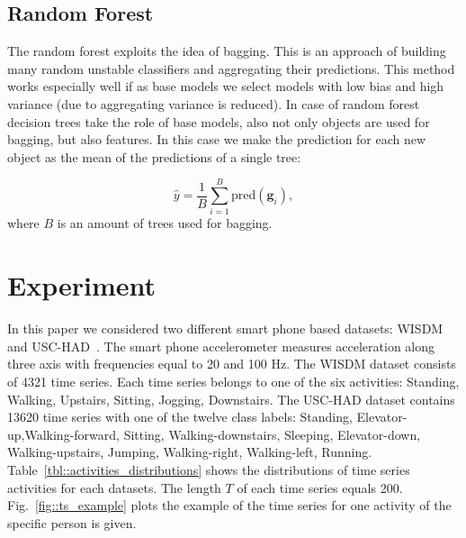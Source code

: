 \subsection{Random Forest}
The random forest exploits the idea of bagging. This is an approach of building many random unstable classifiers and aggregating their predictions. This method works especially well if as base models we select models with low bias and high variance (due to aggregating variance is reduced). In case of random forest decision trees take the role of base models, also not only objects are used for bagging, but also features. In this case we make the prediction for each new object as the mean of the predictions of a single tree:

\begin{equation*}
\hat{y} = \frac{1}{B} \sum_{i=1}^{B} \text{pred}(\bm{g}_i),
\end{equation*}
where $B$ is an amount of trees used for bagging.

\section{Experiment}
In this paper we considered two different smart phone based datasets: WISDM~\cite{wisdm} and USC-HAD~\cite{usc}. 
The smart phone accelerometer measures acceleration along three axis with frequencies equal to 20 and 100 Hz. 
The WISDM dataset consists of 4321 time series. Each time series belongs to one of the six activities: Standing, Walking, Upstairs, Sitting, Jogging, Downstairs. The USC-HAD dataset contains 13620 time series with one of the twelve class labels: Standing, Elevator-up,Walking-forward, Sitting, Walking-downstairs, Sleeping, Elevator-down, Walking-upstairs, Jumping, Walking-right, Walking-left, Running.
Table~\ref{tbl::activities_distributions} shows the distributions of time series activities for each datasets. 
The length $T$ of each time series equals 200. 
Fig.~\ref{fig::ts_example} plots the example of the time series for one activity of the specific person is given.

